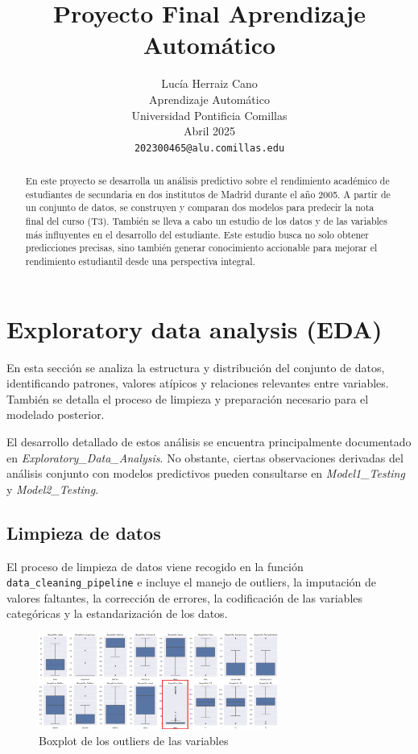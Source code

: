 \documentclass{article}
\title{Proyecto Final Aprendizaje Automático}
\author{%
    Lucía Herraiz Cano\\
    Aprendizaje Automático\\
    Universidad Pontificia Comillas\\
    Abril 2025\\
    \texttt{202300465@alu.comillas.edu} \\
}
\begin{document}
\maketitle


\begin{abstract}
  En este proyecto se desarrolla un análisis predictivo sobre el rendimiento 
  académico de estudiantes de secundaria en dos institutos de Madrid durante 
  el año 2005. A partir de un conjunto de datos, se construyen y comparan dos 
  modelos para predecir la nota final del curso (T3). También se lleva a cabo 
  un estudio de los datos y de las variables más influyentes en el desarrollo
  del estudiante. Este estudio busca no solo obtener predicciones precisas, 
  sino también generar conocimiento accionable para mejorar el rendimiento 
  estudiantil desde una perspectiva integral.
\end{abstract}


\section{Exploratory data analysis (EDA)}


En esta sección se analiza la estructura y distribución del conjunto de datos, identificando patrones, valores atípicos y relaciones relevantes entre variables. También se detalla el proceso de limpieza y preparación necesario para el modelado posterior.

El desarrollo detallado de estos análisis se encuentra principalmente documentado en \textit{Exploratory\_Data\_Analysis}. No obstante, ciertas observaciones derivadas del análisis 
conjunto con modelos predictivos pueden consultarse en \textit{Model1\_Testing} y \textit{Model2\_Testing}.


\subsection{Limpieza de datos}


El proceso de limpieza de datos viene recogido en la función \texttt{data\_cleaning\_pipeline}
e incluye el manejo de outliers, la imputación de valores faltantes, la corrección de errores, la codificación de las variables 
categóricas y la estandarización de los datos.

\begin{figure}[ht]
  \centering
  \includegraphics[width=0.7\textwidth]{Boxplot_Outliers.png}
  \caption{Boxplot de los outliers de las variables}\label{fig:boxplot}
\end{figure}
\end{document}
